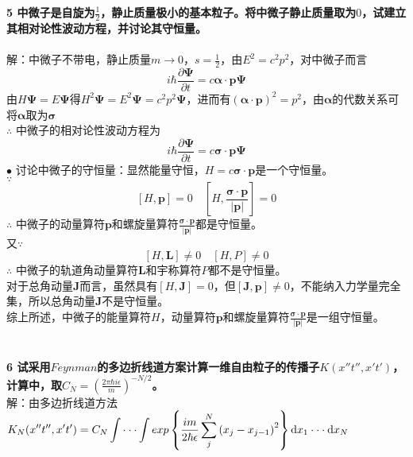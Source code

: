\documentclass[12pt]{article}
\numberwithin{equation}{section}	 %
\begin{document}
\begin{spacing}{1.5}
\textbf{5 \quad 中微子是自旋为$\displaystyle \frac{1}{2}$，静止质量极小的基本粒子。将中微子静止质量取为$0$，试建立其相对论性波动方程，并讨论其守恒量。}\\
~\\
解：中微子不带电，静止质量$m \rightarrow 0$，$\displaystyle s=\frac{1}{2}$，由$E^{2}=c^{2}p^{2}$，对中微子而言
\begin{equation}
i\hbar\frac{\partial\bm\Psi}{\partial t} = c\bm{\alpha\cdot p \Psi}
\end{equation}
由$H\bm\Psi=E\bm\Psi$得$H^{2}\bm\Psi=E^{2}\bm\Psi=c^{2}p^{2}\bm\Psi$，进而有$(\bm{\alpha\cdot p})^{2}=p^{2}$，由$\bm\alpha$的代数关系可将$\bm\alpha$取为$\bm\sigma$\\
$\therefore$ 中微子的相对论性波动方程为
\begin{equation}
i\hbar\frac{\partial\bm\Psi}{\partial t} = c\bm{\sigma\cdot p \Psi}
\end{equation}
$\bullet$ 讨论中微子的守恒量：显然能量守恒，$H=c\bm{\sigma\cdot p}$是一个守恒量。\\
$\because$
\begin{equation}
\left[H,\bm{p}\right]=0 \quad \left[H,\frac{\bm{\sigma\cdot p}}{|\bm{p}|}\right]=0
\end{equation}
$\therefore$ 中微子的动量算符$\bm{p}$和螺旋量算符$\displaystyle \frac{\bm{\sigma\cdot p}}{|\bm{p}|}$都是守恒量。\\
又$\because$
\begin{equation}
\left[H,\bm{L}\right] \ne 0 \quad \left[H,P\right] \ne 0
\end{equation}
$\therefore$ 中微子的轨道角动量算符$\bm{L}$和宇称算符$P$都不是守恒量。\\
对于总角动量$\bm{J}$而言，虽然具有$\left[H,\bm{J}\right]=0$，但$\left[\bm{J},\bm{p}\right] \ne 0$，不能纳入力学量完全集，所以总角动量$\bm{J}$不是守恒量。\\
综上所述，中微子的能量算符$H$，动量算符$\bm{p}$和螺旋量算符$\displaystyle \frac{\bm{\sigma\cdot p}}{|\bm{p}|}$是一组守恒量。\\
~\\
~\\
\textbf{6 \quad 试采用$Feynman$的多边折线道方案计算一维自由粒子的传播子$K(x''t'',x't')$，计算中，取$\displaystyle C_{N} = \left(\frac{2\pi\hbar i\epsilon}{m}\right)^{-N/2}$。}\\
解：由多边折线道方法$\displaystyle K_{N}(x''t'',x't') = C_{N}\int \cdot\cdot\cdot \int exp\left\{\frac{im}{2\hbar\epsilon}\sum_{j}^{N}\left(x_{j}-x_{j-1}\right)^{2}\right\} \mathop{}\!\mathrm{d} x_{1} \cdot\cdot\cdot \mathop{}\!\mathrm{d} x_{N}$ \\

\end{spacing}
\end{document}
